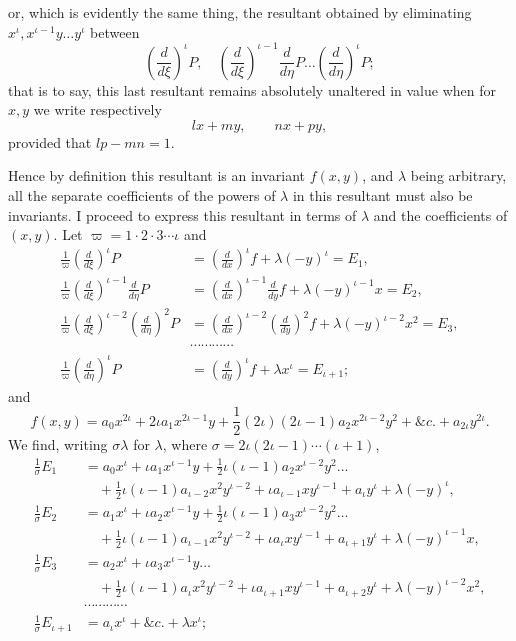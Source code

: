 \documentclass[11pt]{article}
\newcommand{\sourcepage}[1]{\marginpar{\scriptsize p.~#1}}
\begin{document}
\sourcepage{276}
or, which is evidently the same thing, the resultant obtained by eliminating $x^\iota,x^{\iota-1}y\ldots y^\iota$ between
\[
\left(\frac{d}{d\xi}\right)^\iota P,\quad
\left(\frac{d}{d\xi}\right)^{\iota-1}\frac{d}{d\eta}P\ldots
\left(\frac{d}{d\eta}\right)^\iota P;
\]
that is to say, this last resultant remains absolutely unaltered in value when for $x,y$ we write respectively
\[
lx+my,\qquad nx+py,
\]
provided that $lp-mn=1$.

Hence by definition this resultant is an invariant $f(x,y)$, and $\lambda$ being arbitrary, all the separate coefficients of the powers of $\lambda$ in this resultant must also be invariants. I proceed to express this resultant in terms of $\lambda$ and the coefficients of $(x,y)$. Let $\varpi=1\cdot2\cdot3\cdots\iota$ and
\[
\begin{aligned}
\frac1\varpi\left(\frac{d}{d\xi}\right)^\iota P
&=\left(\frac{d}{dx}\right)^\iota f+\lambda(-y)^\iota=E_1,\\
\frac1\varpi\left(\frac{d}{d\xi}\right)^{\iota-1}\frac{d}{d\eta}P
&=\left(\frac{d}{dx}\right)^{\iota-1}\frac{d}{dy}f+\lambda(-y)^{\iota-1}x=E_2,\\
\frac1\varpi\left(\frac{d}{d\xi}\right)^{\iota-2}\left(\frac{d}{d\eta}\right)^2P
&=\left(\frac{d}{dx}\right)^{\iota-2}\left(\frac{d}{dy}\right)^2f+\lambda(-y)^{\iota-2}x^2=E_3,\\
&\cdots\cdots\cdots\cdots\\
\frac1\varpi\left(\frac{d}{d\eta}\right)^\iota P
&=\left(\frac{d}{dy}\right)^\iota f+\lambda x^\iota=E_{\iota+1};
\end{aligned}
\]
and
\[
f(x,y)=a_0x^{2\iota}+2\iota a_1x^{2\iota-1}y+\frac12(2\iota)(2\iota-1)a_2x^{2\iota-2}y^2+\&c.+a_{2\iota}y^{2\iota}.
\]
We find, writing $\sigma\lambda$ for $\lambda$, where $\sigma=2\iota(2\iota-1)\cdots(\iota+1)$,
\[
\begin{aligned}
\frac1\sigma E_1&=a_0x^\iota+\iota a_1x^{\iota-1}y+\frac12\iota(\iota-1)a_2x^{\iota-2}y^2\ldots\\
&\quad+\frac12\iota(\iota-1)a_{\iota-2}x^2y^{\iota-2}+\iota a_{\iota-1}xy^{\iota-1}+a_\iota y^\iota+\lambda(-y)^\iota,\\
\frac1\sigma E_2&=a_1x^\iota+\iota a_2x^{\iota-1}y+\frac12\iota(\iota-1)a_3x^{\iota-2}y^2\ldots\\
&\quad+\frac12\iota(\iota-1)a_{\iota-1}x^2y^{\iota-2}+\iota a_\iota xy^{\iota-1}+a_{\iota+1}y^\iota+\lambda(-y)^{\iota-1}x,\\
\frac1\sigma E_3&=a_2x^\iota+\iota a_3x^{\iota-1}y\ldots\\
&\quad+\frac12\iota(\iota-1)a_\iota x^2y^{\iota-2}+\iota a_{\iota+1}xy^{\iota-1}+a_{\iota+2}y^\iota+\lambda(-y)^{\iota-2}x^2,\\
&\cdots\cdots\cdots\cdots\\
\frac1\sigma E_{\iota+1}&=a_\iota x^\iota+\&c.+\lambda x^\iota;
\end{aligned}
\]
\end{document}
